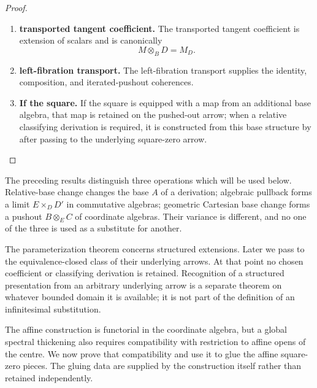 \begin{proof}
\begin{enumerate}[label=\textup{(\arabic*)}]
    \item \textbf{transported tangent coefficient.}
    The transported tangent coefficient is extension of scalars and is canonically
    \[
        M\otimes_BD=M_D.
    \]

    \item \textbf{left-fibration transport.}
    The left-fibration transport supplies the identity, composition, and iterated-pushout
    coherences.

    \item \textbf{If the square.}
    If the square is equipped with a map from an additional base algebra, that map is retained
    on the pushed-out arrow; when a relative classifying derivation is required, it is
    constructed from this base structure by 
    after passing to the underlying square-zero arrow.
\end{enumerate}
\end{proof}

\begin{remark}
\label{rem:three-square-zero-base-changes}
The preceding results distinguish three operations which will be used below.
Relative-base change changes the base \(A\) of a derivation; algebraic pullback
forms a limit \(E\times_DD'\) in commutative algebras; geometric Cartesian
base change forms a pushout \(B\otimes_EC\) of coordinate algebras. Their
variance is different, and no one of the three is used as a substitute for
another.
\end{remark}

\begin{remark}
\label{rem:structured-square-zero-no-hidden-presentation}
The parameterization theorem concerns structured extensions. Later we pass to
the equivalence-closed class of their underlying arrows. At that point no
chosen coefficient or classifying derivation is retained. Recognition of a
structured presentation from an arbitrary underlying arrow is a separate
theorem on whatever bounded domain it is available; it is not part of the
definition of an infinitesimal substitution.
\end{remark}
The affine construction is functorial in the coordinate algebra, but a global
spectral thickening also requires compatibility with restriction to affine
opens of the centre. We now prove that compatibility and use it to glue the
affine square-zero pieces. The gluing data are supplied by the construction
itself rather than retained independently.

